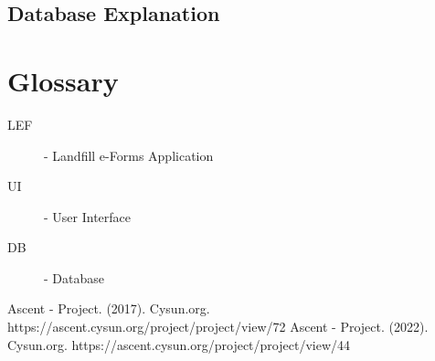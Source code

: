 \documentclass[12pt]{article}
\begin{document}
\subsection{Database Explanation}
\newpage

\section*{Glossary}
\begin{description}
    \item[LEF] - Landfill e-Forms Application
    \item[UI] - User Interface
    \item[DB] - Database 
\end{description}
\newpage

\begin{thebibliography}{9}
     Ascent - Project. (2017). Cysun.org. https://ascent.cysun.org/project/project/view/72
     Ascent - Project. (2022). Cysun.org. https://ascent.cysun.org/project/project/view/44
\end{thebibliography}
\end{document}
